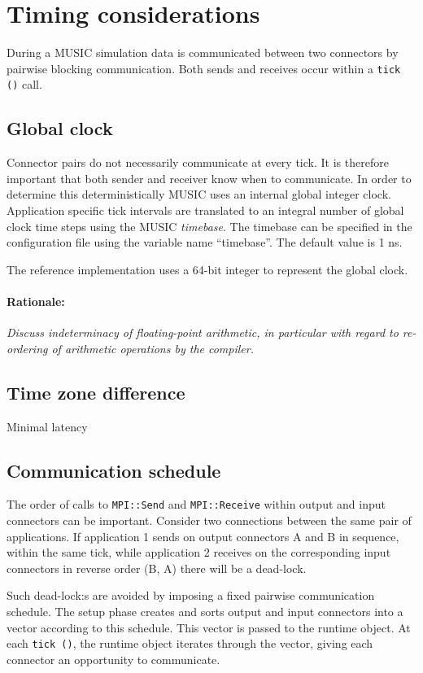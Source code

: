 \documentclass[a4paper]{report}
\newenvironment{rationale}%
{\par\paragraph{Rationale:}}%
{\par}
\begin{document}
\section{Timing considerations}

During a MUSIC simulation data is communicated between two connectors
by pairwise blocking communication.  Both sends and receives occur
within a \verb|tick ()| call.

\subsection{Global clock}

Connector pairs do not necessarily communicate at every tick.  It is
therefore important that both sender and receiver know when to
communicate.  In order to determine this deterministically MUSIC uses
an internal global integer clock.  Application specific tick intervals
are translated to an integral number of global clock time steps using
the MUSIC \emph{timebase}.  The timebase can be specified in the
configuration file using the variable name ``timebase''.  The default
value is 1 ns.

The reference implementation uses a 64-bit integer to represent the
global clock.

\begin{rationale}
  \emph{Discuss indeterminacy of floating-point arithmetic, in particular
    with regard to re-ordering of arithmetic operations by the compiler.}
\end{rationale}

\subsection{Time zone difference}

Minimal latency

\subsection{Communication schedule}

The order of calls to \verb|MPI::Send| and \verb|MPI::Receive| within
output and input connectors can be important.  Consider two
connections between the same pair of applications.  If application 1
sends on output connectors A and B in sequence, within the same tick,
while application 2 receives on the corresponding input connectors in
reverse order (B, A) there will be a dead-lock.

Such dead-lock:s are avoided by imposing a fixed pairwise
communication schedule.  The setup phase creates and sorts output and
input connectors into a vector according to this schedule.  This
vector is passed to the runtime object.  At each \verb|tick ()|, the
runtime object iterates through the vector, giving each connector an
opportunity to communicate.
\end{document}
